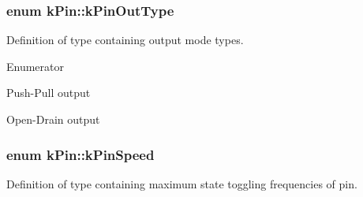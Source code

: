 \subsubsection[{\texorpdfstring{k\+Pin\+Out\+Type}{kPinOutType}}]{\setlength{\rightskip}{0pt plus 5cm}enum {\bf k\+Pin\+::k\+Pin\+Out\+Type}}\hypertarget{classkPin_a5aa9350fb0a7617a568344d8a074837f}{}\label{classkPin_a5aa9350fb0a7617a568344d8a074837f}


Definition of type containing output mode types. 

\begin{Desc}
\item[Enumerator]\par
\begin{description}
\item[{\em 
Push\+Pull\hypertarget{classkPin_a5aa9350fb0a7617a568344d8a074837fa91ae703d8d54aa82385684e9fcd89190}{}\label{classkPin_a5aa9350fb0a7617a568344d8a074837fa91ae703d8d54aa82385684e9fcd89190}
}]Push-\/\+Pull output \item[{\em 
Open\+Drain\hypertarget{classkPin_a5aa9350fb0a7617a568344d8a074837fa0f1c262ab8465ee84ca83377044c6c07}{}\label{classkPin_a5aa9350fb0a7617a568344d8a074837fa0f1c262ab8465ee84ca83377044c6c07}
}]Open-\/\+Drain output \end{description}
\end{Desc}
\subsubsection[{\texorpdfstring{k\+Pin\+Speed}{kPinSpeed}}]{\setlength{\rightskip}{0pt plus 5cm}enum {\bf k\+Pin\+::k\+Pin\+Speed}}\hypertarget{classkPin_a93c5cec6b9b90fda782cfa847eacdb8b}{}\label{classkPin_a93c5cec6b9b90fda782cfa847eacdb8b}


Definition of type containing maximum state toggling frequencies of pin. 

